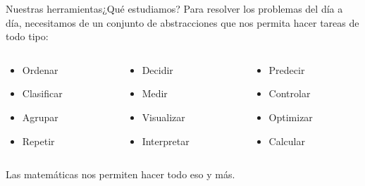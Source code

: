 \documentclass[spanish]{beamer}
\begin{document}
\begin{frame}{Nuestras herramientas}{¿Qué estudiamos?}
    Para resolver los problemas del día a día, necesitamos de un conjunto de abstracciones que nos permita hacer tareas de todo tipo: \pause

    \bigskip

    \begin{columns}
        \begin{column}{0.33\textwidth}
            \begin{center}
                \begin{itemize}
                    \item Ordenar
                    \item Clasificar
                    \item Agrupar
                    \item Repetir
                \end{itemize}
            \end{center}
        \end{column}
        \begin{column}{0.33\textwidth}
            \begin{center}
                \begin{itemize}
                    \item Decidir
                    \item Medir
                    \item Visualizar
                    \item Interpretar
                \end{itemize}
            \end{center}
        \end{column}
        \begin{column}{0.33\textwidth}
            \begin{center}
                \begin{itemize}
                    \item Predecir
                    \item Controlar
                    \item Optimizar
                    \item Calcular
                \end{itemize}                
            \end{center}
        \end{column}
    \end{columns} \pause
    
    \bigskip

    \begin{center}
        \Large
        Las \alert{matemáticas} nos permiten hacer todo eso y más.
    \end{center}

\end{frame}
\end{document}

